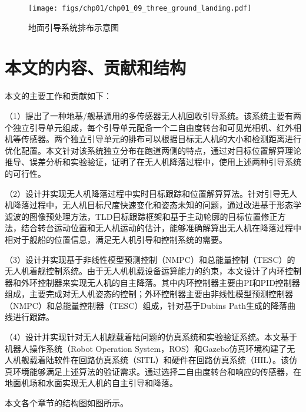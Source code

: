 \begin{figure}[htb]   
	\centering
	\texttt{[image: figs/chp01/chp01\_09\_three\_ground\_landing.pdf]}
	\caption{地面引导系统排布示意图\cite{Martinez2010}}
	\label{fig:chp01_09_three_ground_landing}
\end{figure}

\section{本文的内容、贡献和结构}
本文的主要工作和贡献如下：

（1）提出了一种地基/舰基通用的多传感器无人机回收引导系统。该系统主要有两个独立引导单元组成，每个引导单元配备一个二自由度转台和可见光相机、红外相机等传感器。两个独立引导单元的排布可以根据目标无人机的大小和检测距离进行优化配置。本文针对该系统独立分布在跑道两侧的特点，通过对目标位置解算理论推导、误差分析和实验验证，证明了在无人机降落过程中，使用上述两种引导系统的可行性。

（2）设计并实现无人机降落过程中实时目标跟踪和位置解算算法。针对引导无人机降落过程中，无人机目标尺度快速变化和姿态未知的问题，通过改进基于形态学滤波的图像预处理方法，TLD目标跟踪框架和基于主动轮廓的目标位置修正方法，结合转台运动位置和无人机运动的估计，能够准确解算出无人机在降落过程中相对于舰船的位置信息，满足无人机引导和控制系统的需要。

（3）设计并实现基于非线性模型预测控制（NMPC）和总能量控制（TESC）的无人机着舰控制系统。由于无人机机载设备运算能力的约束，本文设计了内环控制器和外环控制器来实现无人机的自主降落。其中内环控制器主要由PI和PID控制器组成，主要完成对无人机姿态的控制；外环控制器主要由非线性模型预测控制器（NMPC）和总能量控制器（TESC）组成，针对基于Dubins Path生成的降落曲线进行跟踪。

（4）设计并实现针对无人机舰载着陆问题的仿真系统和实验验证系统。本文基于机器人操作系统（Robot Operation System，ROS）和Gazebo仿真环境构建了无人机舰载着陆软件在回路仿真系统（SITL）和硬件在回路仿真系统（HIL）。该仿真环境能够满足上述算法的验证需求。通过选择二自由度转台和响应的传感器，在地面机场和水面实现无人机的自主引导和降落。

本文各个章节的结构图如图所示。

